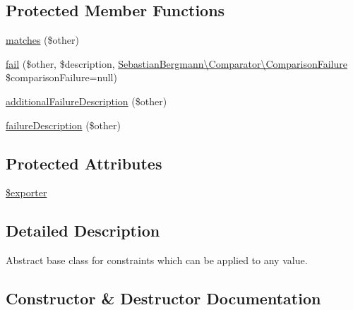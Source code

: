 \subsection*{Protected Member Functions}
\begin{DoxyCompactItemize}
\item 
\mbox{\hyperlink{class_p_h_p_unit___framework___constraint_a9c9c337de483bbdbb9fa249a6c7c9cc5}{matches}} (\$other)
\item 
\mbox{\hyperlink{class_p_h_p_unit___framework___constraint_a4d91acc3f5ec5213f60c8f67b3b54125}{fail}} (\$other, \$description, \mbox{\hyperlink{class_sebastian_bergmann_1_1_comparator_1_1_comparison_failure}{Sebastian\+Bergmann\textbackslash{}\+Comparator\textbackslash{}\+Comparison\+Failure}} \$comparison\+Failure=null)
\item 
\mbox{\hyperlink{class_p_h_p_unit___framework___constraint_ac90d1ef6c5737c595b1a8b1f3d3b230b}{additional\+Failure\+Description}} (\$other)
\item 
\mbox{\hyperlink{class_p_h_p_unit___framework___constraint_aaabb679273bfb812df4d81c283754a59}{failure\+Description}} (\$other)
\end{DoxyCompactItemize}
\subsection*{Protected Attributes}
\begin{DoxyCompactItemize}
\item 
\mbox{\hyperlink{class_p_h_p_unit___framework___constraint_af9b6401d3b379ed200e8fde8d4600523}{\$exporter}}
\end{DoxyCompactItemize}


\subsection{Detailed Description}
Abstract base class for constraints which can be applied to any value. 

\subsection{Constructor \& Destructor Documentation}
\mbox{\label{class_p_h_p_unit___framework___constraint_a095c5d389db211932136b53f25f39685}} 
